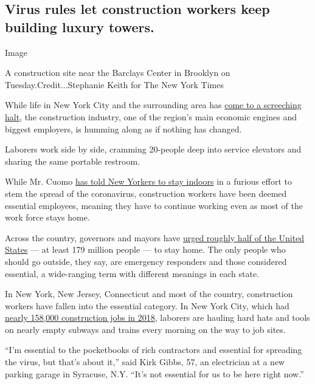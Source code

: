 \hypertarget{virus-rules-let-construction-workers-keep-building-luxury-towers}{%
\subsection{Virus rules let construction workers keep building luxury
towers.}\label{virus-rules-let-construction-workers-keep-building-luxury-towers}}

Image

A construction site near the Barclays Center in Brooklyn on
Tuesday.Credit...Stephanie Keith for The New York Times

While life in New York City and the surrounding area has
\href{https://www.nytimes3xbfgragh.onion/2020/03/24/nyregion/coronavirus-new-york-apex-andrew-cuomo.html}{come
to a screeching halt}, the construction industry, one of the region's
main economic engines and biggest employers, is humming along as if
nothing has changed.

Laborers work side by side, cramming 20-people deep into service
elevators and sharing the same portable restroom.

While Mr. Cuomo
\href{https://www.nytimes3xbfgragh.onion/article/what-is-shelter-in-place-coronavirus.html}{has
told New Yorkers to stay indoors} in a furious effort to stem the spread
of the coronavirus, construction workers have been deemed essential
employees, meaning they have to continue working even as most of the
work force stays home.

Across the country, governors and mayors have
\href{https://www.nytimes3xbfgragh.onion/interactive/2020/us/coronavirus-stay-at-home-order.html}{urged
roughly half of the United States} --- at least 179 million people ---
to stay home. The only people who should go outside, they say, are
emergency responders and those considered essential, a wide-ranging term
with different meanings in each state.

In New York, New Jersey, Connecticut and most of the country,
construction workers have fallen into the essential category. In New
York City, which had
\href{https://osc.state.ny.us/osdc/report-2-2020.pdf}{nearly 158,000
construction jobs in 2018}, laborers are hauling hard hats and tools on
nearly empty subways and trains every morning on the way to job sites.

``I'm essential to the pocketbooks of rich contractors and essential for
spreading the virus, but that's about it,'' said Kirk Gibbs, 57, an
electrician at a new parking garage in Syracuse, N.Y. ``It's not
essential for us to be here right now.''

